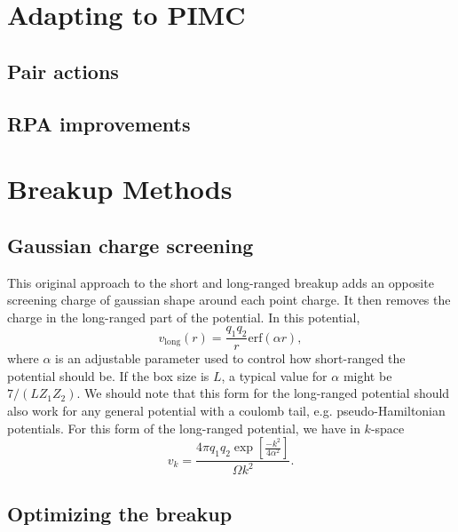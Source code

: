 \documentclass{article}
\begin{document}
\section{Adapting to PIMC}
\subsection{Pair actions}
\subsection{RPA improvements}
\section{Breakup Methods}
\subsection{Gaussian charge screening}
This original approach to the short and long-ranged breakup adds an
opposite screening charge of gaussian shape around each point charge.
It then removes the charge in the long-ranged part of the potential.
In this potential,
\begin{equation}
v_{\text{long}}(r) = \frac{q_1 q_2}{r} \text{erf}(\alpha r),
\end{equation}
where $\alpha$ is an adjustable parameter used to control how
short-ranged the potential should be.  If the box size is $L$, a
typical value for $\alpha$ might be $7/(LZ_1 Z_2)$. We should note
that this form for the long-ranged potential should also work for any
general potential with a coulomb tail, e.g. pseudo-Hamiltonian
potentials.  For this form of the long-ranged potential, we have in $k$-space
\begin{equation}
v_k = \frac{4\pi q_1 q_2 \exp\left[\frac{-k^2}{4\alpha^2}\right]}{\Omega k^2}.
\end{equation}

\subsection{Optimizing the breakup}
\end{document}
